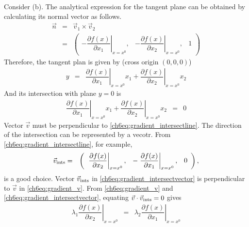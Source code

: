 Consider (b). The analytical expression for the tangent plane can be obtained by calculating its normal vector as follows.
\begin{eqnarray}
  \vec{n} &=& \vec{v}_1 \times \vec{v}_2 \nonumber \\
  &=& \left(\begin{array}{ccc}
              -\left.\dfrac{\partial f(x)}{\partial x_1}\right|_{x=x^0}, & -\left.\dfrac{\partial f(x)}{\partial x_2}\right|_{x=x^0}, & 1
            \end{array}\right) \nonumber
\end{eqnarray}
Therefore, the tangent plan is given by (cross origin $(0,0,0)$)
\begin{eqnarray}
  y &=& \left.\dfrac{\partial f(x)}{\partial x_1}\right|_{x=x^0} x_1 + \left.\dfrac{\partial f(x)}{\partial x_2}\right|_{x=x^0} x_2 \nonumber
\end{eqnarray}
And its intersection with plane $y=0$ is
\begin{eqnarray}
  \left.\dfrac{\partial f(x)}{\partial x_1}\right|_{x=x^0} x_1 + \left.\dfrac{\partial f(x)}{\partial x_2}\right|_{x=x^0} x_2 &=& 0 \label{ch6eq:gradient_intersectline}
\end{eqnarray}
Vector $\vec{v}$ must be perpendicular to \eqref{ch6eq:gradient_intersectline}. The direction of the intersection can be represented by a vecotr. From \eqref{ch6eq:gradient_intersectline}, for example,
\begin{eqnarray}
   \vec{v}_{\textup{ints}} &=& \left(\begin{array}{ccc}
              \left.\dfrac{\partial f(x)}{\partial x_2}\right|_{x=x^0}, & -\left.\dfrac{\partial f(x)}{\partial x_1}\right|_{x=x^0}, & 0
            \end{array}\right), \label{ch6eq:gradient_intersectvector}
\end{eqnarray}
is a good choice. Vector $\vec{v}_{\textup{ints}}$ in \eqref{ch6eq:gradient_intersectvector} is perpendicular to $\vec{v}$ in \eqref{ch6eq:gradient_v}. From \eqref{ch6eq:gradient_v} and \eqref{ch6eq:gradient_intersectvector}, equating $\vec{v} \cdot \vec{v}_{\textup{ints}} = 0$ gives
\begin{eqnarray}
  \lambda_1 \left.\dfrac{\partial f(x)}{\partial x_2}\right|_{x=x^0} &=& \lambda_2 \left.\dfrac{\partial f(x)}{\partial x_1}\right|_{x=x^0} \label{ch6eq:gradient_lambdarestrict}
\end{eqnarray}

